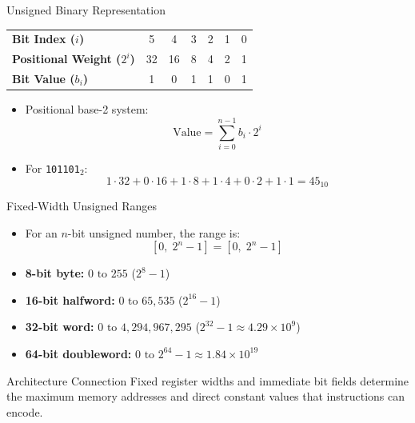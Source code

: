 \documentclass[aspectratio=169,11pt]{beamer}
\newcommand{\key}[1]{\textbf{#1}}
\newcommand{\bits}[1]{\texttt{#1}}
\begin{document}
\begin{frame}{Unsigned Binary Representation}

\begin{center}
\begin{tabular}{lcccccc}
\toprule
\textbf{Bit Index ($i$)} & 5 & 4 & 3 & 2 & 1 & 0 \\
\textbf{Positional Weight ($2^i$)} & 32 & 16 & 8 & 4 & 2 & 1 \\
\midrule
\textbf{Bit Value ($b_i$)} & 1 & 0 & 1 & 1 & 0 & 1 \\
\bottomrule
\end{tabular}
\end{center}

\vspace{0.5em}

\begin{itemize}
  \item Positional base-2 system:
  $$\text{Value} = \sum_{i=0}^{n-1} b_i \cdot 2^i$$
  \item For \bits{101101}$_2$:
  $$1\cdot 32 + 0\cdot 16 + 1\cdot 8 + 1\cdot 4 + 0\cdot 2 + 1\cdot 1 = 45_{10}$$
\end{itemize}

\end{frame}


\begin{frame}{Fixed-Width Unsigned Ranges}

\begin{itemize}
  \item For an $n$-bit unsigned number, the range is:
  $$\left[0,\; 2^n - 1\right] = [0,\; 2^n-1]$$
  \item \key{8-bit byte:} $0 \text{ to } 255$ ($2^8 - 1$)
  \item \key{16-bit halfword:} $0 \text{ to } 65{,}535$ ($2^{16} - 1$)
  \item \key{32-bit word:} $0 \text{ to } 4{,}294{,}967{,}295$ ($2^{32} - 1 \approx 4.29 \times 10^9$)
  \item \key{64-bit doubleword:} $0 \text{ to } 2^{64} - 1 \approx 1.84 \times 10^{19}$
\end{itemize}

\begin{block}{Architecture Connection}
Fixed register widths and immediate bit fields determine the maximum memory addresses and direct constant values that instructions can encode.
\end{block}

\end{frame}
\end{document}
